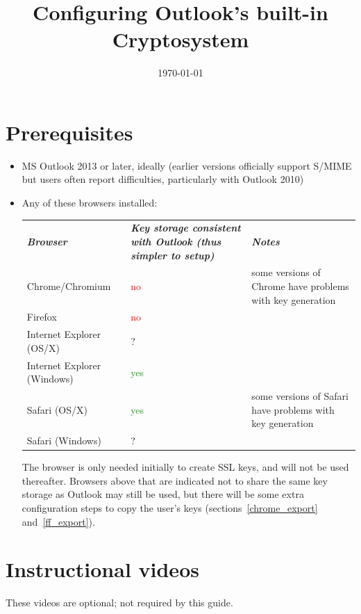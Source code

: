\documentclass[pdftex,12pt,titlepage=false]{scrartcl}
\title{\rmfamily Configuring Outlook's built-in Cryptosystem}
\date{\rmfamily\today}
\newcommand{\yesgood}{\textcolor{ForestGreen}{yes}}
\newcommand{\nobad}{\textcolor{red}{no}}
\begin{document}
\maketitle

\tableofcontents

\section{Prerequisites}
\begin{itemize}
\item MS Outlook 2013 or later, ideally (earlier versions officially
  support S/MIME but users often report difficulties, particularly
  with Outlook 2010)
\item Any of these browsers installed:

  \begin{tabular}{lp{65mm}p{}}
    \textsl{\textbf{Browser}}        & \textsl{\textbf{Key storage consistent with Outlook (thus simpler to setup)}} & \textsl{\textbf{Notes}}\\
    Chrome/Chromium                  & \nobad   & some versions of Chrome have problems with key generation\\
    Firefox                          & \nobad   &\\
    Internet Explorer \tiny(OS/X)    & ?        &\\
    Internet Explorer \tiny(Windows) & \yesgood &\\
    Safari \tiny(OS/X)               & \yesgood & some versions of Safari have problems with key generation\\
    Safari \tiny(Windows)            & ?        &\\
  \end{tabular}

  The browser is only needed initially to create SSL keys, and will
  not be used thereafter.  Browsers above that are indicated not to
  share the same key storage as Outlook may still be used, but there
  will be some extra configuration steps to copy the user's keys
  (sections~\ref{chrome_export} and~\ref{ff_export}).
\end{itemize}

\section{Instructional videos}
These videos are optional; not required by this guide.
\end{document}
